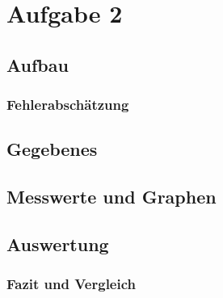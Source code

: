\section{Aufgabe 2}
\subsection{Aufbau}
\subsubsection{Fehlerabschätzung}
\subsection{Gegebenes}
\subsection{Messwerte und Graphen}
\subsection{Auswertung}
\subsubsection{Fazit und Vergleich}